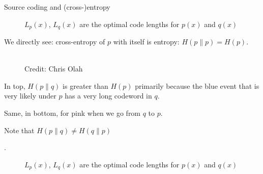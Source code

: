 \documentclass[11pt,compress,t,notes=noshow, xcolor=table]{beamer}
\begin{document}
\begin{vbframe} {Source coding and (cross-)entropy}
\begin{figure}
    \centering
      \caption{\footnotesize{$L_p(x)$, $L_q(x)$ are the optimal code lengths for $p(x)$ and $q(x)$}}
  \end{figure}
  
We directly see: cross-entropy of $p$ with itself is entropy: $H(p \| p) = H(p)$.
  
\framebreak
  \begin{figure}
    \centering
      \tiny{\\ Credit: Chris Olah}
  \end{figure}
  
  \begin{itemize}
    \item \small{In top, $H(p \| q)$ is greater than $H(p)$ primarily because the blue event that is very likely under $p$ has a very long codeword in $q$.
    \item Same, in bottom, for pink when we go from $q$ to $p$.
    \item Note that $H(p \| q) \neq H(q \| p)$}. 
  \end{itemize}

  \framebreak

  \begin{figure}
    \centering
      \caption{\footnotesize{$L_p(x)$, $L_q(x)$ are the optimal code lengths for $p(x)$ and $q(x)$}}
  \end{figure}
  

\end{vbframe}
\end{document}
